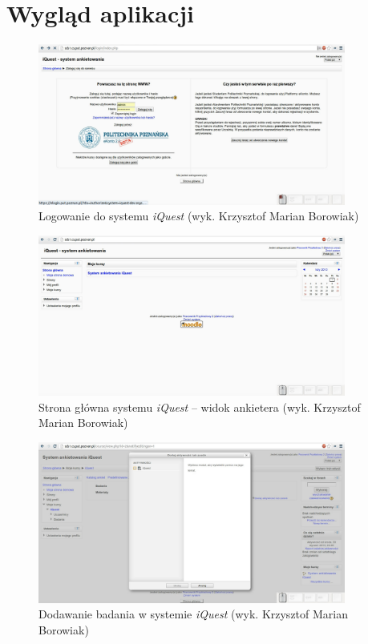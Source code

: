 \chapter{Wygląd aplikacji}
\label{Chapterb1}

\begin{figure}[H]
\centering\includegraphics[width=0.9\textwidth]{figures/kb/W2-logowanie}
\caption{Logowanie do systemu \textit{iQuest} (wyk. Krzysztof Marian Borowiak)}\label{rys:Logowanie}
\end{figure}

\begin{figure}[H]
\centering\includegraphics[width=0.9\textwidth]{figures/kb/W2-stronaglowna}
\caption{Strona główna systemu \textit{iQuest} -- widok ankietera (wyk. Krzysztof Marian Borowiak)}\label{rys:StronaGlowna}
\end{figure}

\begin{figure}[H]
\centering\includegraphics[width=0.9\textwidth]{figures/kb/W2-dodawaniebadania}
\caption{Dodawanie badania w systemie \textit{iQuest} (wyk. Krzysztof Marian Borowiak)}\label{rys:DodawanieBadania}
\end{figure}

